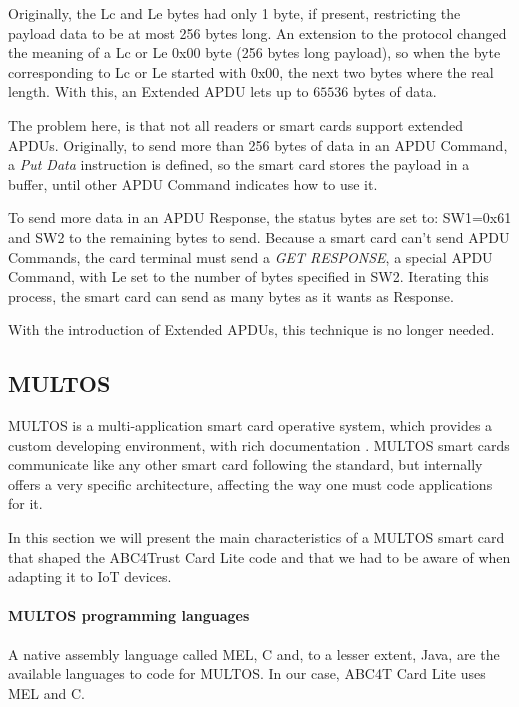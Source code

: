 Originally, the Lc and Le bytes had only 1 byte, if present, restricting the payload data to be at most 256 bytes long. An extension to the protocol changed the meaning of a Lc or Le 0x00 byte (256 bytes long payload), so when the byte corresponding to Lc or Le started with 0x00, the next two bytes where the real length.  With this, an Extended APDU lets up to $65536$ bytes of data.

The problem here, is that not all readers or smart cards support extended APDUs. Originally, to send more than 256 bytes of data in an APDU Command, a \textit{Put Data} instruction is defined, so the smart card stores the payload in a buffer, until other APDU Command indicates how to use it.

To send more data in an APDU Response, the status bytes are set to: SW1=0x61 and SW2 to the remaining bytes to send. Because a smart card can't send APDU Commands, the card terminal must send a \textit{GET RESPONSE}, a special APDU Command, with Le set to the number of bytes specified in SW2. Iterating this process, the smart card can send as many bytes as it wants as Response.

With the introduction of Extended APDUs, this technique is no longer needed.






\subsection{MULTOS}

MULTOS is a multi-application smart card operative system, which provides a custom developing environment, with rich documentation \citep{MultosTechLib}. MULTOS smart cards communicate like any other smart card following the standard, but internally offers a very specific architecture, affecting the way one must code applications for it.

In this section we will present the main characteristics of a MULTOS smart card that shaped the ABC4Trust Card Lite code and that we had to be aware of when adapting it to IoT devices.


\paragraph{MULTOS programming languages} A native assembly language called MEL, C and, to a lesser extent, Java, are the available languages to code for MULTOS. In our case, ABC4T Card Lite uses MEL and C.

